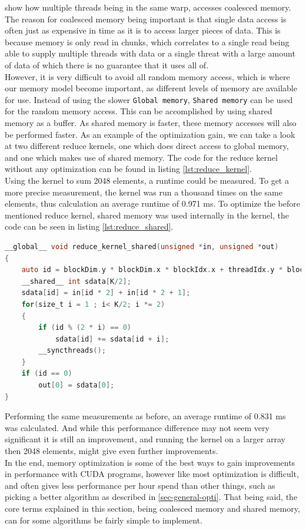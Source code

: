  show how multiple threads being in the same warp, accesses coalesced memory. The reason for coalesced memory being important is that single data access is often just as expensive in time as it is to access larger pieces of data. This is because memory is only read in chunks, which correlates to a single read being able to supply multiple threads with data or a single threat with a large amount of data of which there is no guarantee that it uses all of.\\

However, it is very difficult to avoid all random memory access, which is where our memory model become important, as different levels of memory are available for use. Instead of using the slower \texttt{Global memory}, \texttt{Shared memory} can be used for the random memory access. This can be accomplished by using shared memory as a buffer. As shared memory is faster, these memory accesses will also be performed faster. As an example of the optimization gain, we can take a look at two different reduce kernels, one which does direct access to global memory, and one which makes use of shared memory. The code for the reduce kernel without any optimization can be found in listing \ref{lst:reduce_kernel}.\\

Using the kernel to sum 2048 elements, a runtime could be measured. To get a more precise measurement, the kernel was run a thousand times on the same elements, thus calculation an average runtime of 0.971 ms. To optimize the before mentioned reduce kernel, shared memory was used internally in the kernel, the code can be seen in listing \ref{lst:reduce_shared}.

\begin{lstlisting}[language=C,caption={TBD},label=lst:reduce_shared]
__global__ void reduce_kernel_shared(unsigned *in, unsigned *out) 
{
	auto id = blockDim.y * blockDim.x * blockIdx.x + threadIdx.y * blockDim.x + threadIdx.x;
	__shared__ int sdata[K/2];
	sdata[id] = in[id * 2] + in[id * 2 + 1];
	for(size_t i = 1 ; i< K/2; i *= 2) 
	{
		if (id % (2 * i) == 0)
			sdata[id] += sdata[id + i];
		__syncthreads();
	}
	if (id == 0) 
		out[0] = sdata[0];
}
\end{lstlisting}

Performing the same measurements as before, an average runtime of 0.831 ms was calculated. And while this performance difference may not seem very significant it is still an improvement, and running the kernel on a larger array then 2048 elements, might give even further improvements.\\

In the end, memory optimization is some of the best ways to gain improvements in performance with CUDA programs, however like most optimization is difficult, and often gives less performance per hour spend than other things, such as picking a better algorithm as described in \cref{sec-general-opti}. That being said, the core terms explained in this section, being coalesced memory and shared memory, can for some algorithms be fairly simple to implement.